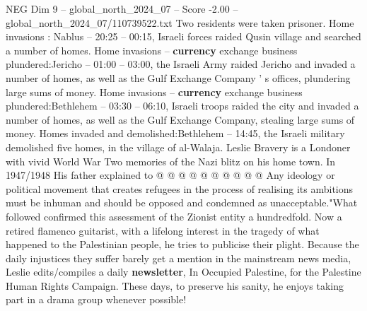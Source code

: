 \begin{textsample}{NEG Dim 9 – global\_north\_2024\_07 – Score -2.00 – global\_north\_2024\_07/110739522.txt}
Two residents were taken prisoner.
Home invasions : Nablus -- 20:25 -- 00:15, Israeli forces raided Qusin village and searched a number of homes.
Home invasions -- \textbf{currency} exchange business plundered:Jericho -- 01:00 -- 03:00, the Israeli Army raided Jericho and invaded a number of homes, as well as the Gulf Exchange Company ' s offices, plundering large sums of money.
Home invasions -- \textbf{currency} exchange business plundered:Bethlehem -- 03:30 -- 06:10, Israeli troops raided the city and invaded a number of homes, as well as the Gulf Exchange Company, stealing large sums of money.
Homes invaded and demolished:Bethlehem -- 14:45, the Israeli military demolished five homes, in the village of al-Walaja.
Leslie Bravery is a Londoner with vivid World War Two memories of the Nazi blitz on his home town.
In 1947/1948 His father explained to @ @ @ @ @ @ @ @ @ @ Any ideology or political movement that creates refugees in the process of realising its ambitions must be inhuman and should be opposed and condemned as unacceptable."What followed confirmed this assessment of the Zionist entity a hundredfold.
Now a retired flamenco guitarist, with a lifelong interest in the tragedy of what happened to the Palestinian people, he tries to publicise their plight.
Because the daily injustices they suffer barely get a mention in the mainstream news media, Leslie edits/compiles a daily \textbf{newsletter}, In Occupied Palestine, for the Palestine Human Rights Campaign.
These days, to preserve his sanity, he enjoys taking part in a drama group whenever possible!

\end{textsample}
